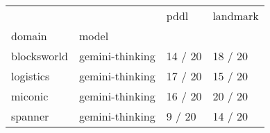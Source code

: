 \begin{tabular}{llll}
\toprule
 &  & pddl & landmark \\
domain & model &  &  \\
\midrule
blocksworld & gemini-thinking & 14 / 20 & 18 / 20 \\
\cline{1-4}
logistics & gemini-thinking & 17 / 20 & 15 / 20 \\
\cline{1-4}
miconic & gemini-thinking & 16 / 20 & 20 / 20 \\
\cline{1-4}
spanner & gemini-thinking & 9 / 20 & 14 / 20 \\
\cline{1-4}
\end{tabular}